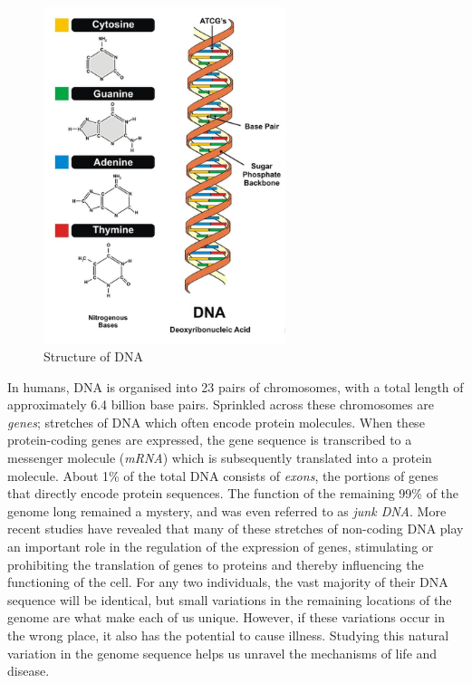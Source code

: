 \begin{figure}
    \centering
    \includegraphics[width=200pt]{chapters/images/introduction/dna-structure.png}
    \caption{Structure of DNA}\label{fig:dnastructure}
\end{figure}

In humans, DNA is organised into 23 pairs of chromosomes, with a total length of approximately 6.4 billion base pairs. Sprinkled across these chromosomes are \emph{genes}; stretches of DNA which often encode protein molecules. When these protein-coding genes are expressed, the gene sequence is transcribed to a messenger molecule (\emph{mRNA}) which is subsequently translated into a protein molecule. About 1\% of the total DNA consists of \emph{exons}, the portions of genes that directly encode protein sequences. The function of the remaining 99\% of the genome long remained a mystery, and was even referred to as \emph{junk DNA}. More recent studies have revealed that many of these stretches of non-coding DNA play an important role in the regulation of the expression of genes, stimulating or prohibiting the translation of genes to proteins and thereby influencing the functioning of the cell. For any two individuals, the vast majority of their DNA sequence will be identical, but small variations in the remaining locations of the genome are what make each of us unique. However, if these variations occur in the wrong place, it also has the potential to cause illness. Studying this natural variation in the genome sequence helps us unravel the mechanisms of life and disease.


